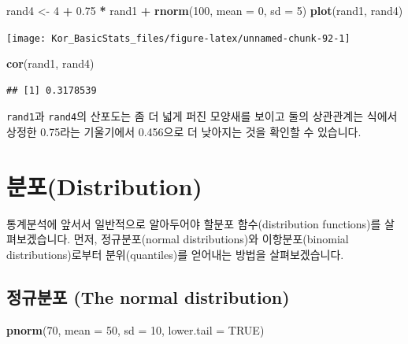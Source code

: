 \documentclass[]{book}
\newenvironment{Shaded}{\begin{snugshade}}{\end{snugshade}}
\newcommand{\DataTypeTok}[1]{\textcolor[rgb]{0.13,0.29,0.53}{#1}}
\newcommand{\DecValTok}[1]{\textcolor[rgb]{0.00,0.00,0.81}{#1}}
\newcommand{\FloatTok}[1]{\textcolor[rgb]{0.00,0.00,0.81}{#1}}
\newcommand{\KeywordTok}[1]{\textcolor[rgb]{0.13,0.29,0.53}{\textbf{#1}}}
\newcommand{\NormalTok}[1]{#1}
\newcommand{\OperatorTok}[1]{\textcolor[rgb]{0.81,0.36,0.00}{\textbf{#1}}}
\newcommand{\OtherTok}[1]{\textcolor[rgb]{0.56,0.35,0.01}{#1}}
\newcommand{\StringTok}[1]{\textcolor[rgb]{0.31,0.60,0.02}{#1}}
\begin{document}
\begin{Shaded}
\begin{Highlighting}[]
\NormalTok{rand4 <-}\StringTok{ }\DecValTok{4} \OperatorTok{+}\StringTok{ }\FloatTok{0.75} \OperatorTok{*}\StringTok{ }\NormalTok{rand1 }\OperatorTok{+}\StringTok{ }\KeywordTok{rnorm}\NormalTok{(}\DecValTok{100}\NormalTok{, }\DataTypeTok{mean =} \DecValTok{0}\NormalTok{, }\DataTypeTok{sd =} \DecValTok{5}\NormalTok{)}
\KeywordTok{plot}\NormalTok{(rand1, rand4)}
\end{Highlighting}
\end{Shaded}

\begin{center}\texttt{[image: Kor\_BasicStats\_files/figure-latex/unnamed-chunk-92-1]} \end{center}

\begin{Shaded}
\begin{Highlighting}[]
\KeywordTok{cor}\NormalTok{(rand1, rand4)}
\end{Highlighting}
\end{Shaded}

\begin{verbatim}
## [1] 0.3178539
\end{verbatim}

\texttt{rand1}과 \texttt{rand4}의 산포도는 좀 더 넓게 퍼진 모양새를 보이고 둘의 상관관계는 식에서 상정한 0.75라는 기울기에서 0.456으로 더 낮아지는 것을 확인할 수 있습니다.

\hypertarget{uxbd84uxd3ecdistribution}{%
\section{분포(Distribution)}\label{uxbd84uxd3ecdistribution}}

통계분석에 앞서서 일반적으로 알아두어야 할분포 함수(distribution functions)를 살펴보겠습니다. 먼저, 정규분포(normal distributions)와 이항분포(binomial distributions)로부터 분위(quantiles)를 얻어내는 방법을 살펴보겠습니다.

\hypertarget{uxc815uxaddcuxbd84uxd3ec-the-normal-distribution}{%
\subsection{정규분포 (The normal distribution)}\label{uxc815uxaddcuxbd84uxd3ec-the-normal-distribution}}

\begin{Shaded}
\begin{Highlighting}[]
\KeywordTok{pnorm}\NormalTok{(}\DecValTok{70}\NormalTok{, }\DataTypeTok{mean =} \DecValTok{50}\NormalTok{, }\DataTypeTok{sd =} \DecValTok{10}\NormalTok{, }\DataTypeTok{lower.tail =} \OtherTok{TRUE}\NormalTok{)}
\end{Highlighting}
\end{Shaded}
\end{document}
